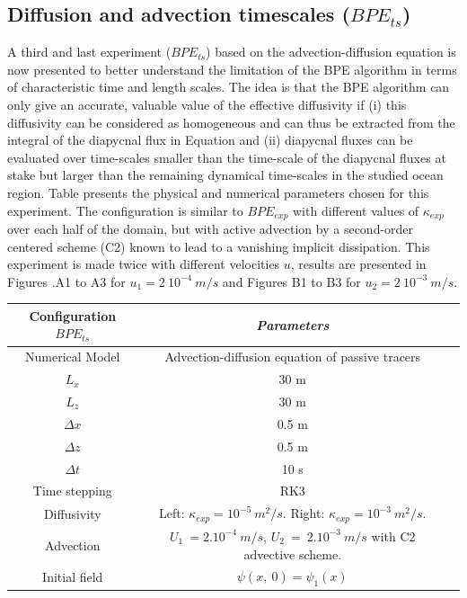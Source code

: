 \subsection{Diffusion and advection timescales ($BPE_{ts}$)}
A third and last experiment ($BPE_{ts}$) based on the advection-diffusion equation  is now presented to better understand the limitation of the BPE algorithm in terms of characteristic time and length scales. The idea is that the BPE algorithm can only give an accurate, valuable value of the effective diffusivity if (i) this diffusivity can be considered as homogeneous and can thus be extracted from the integral of the diapycnal flux in Equation  and (ii) diapycnal fluxes can be evaluated over time-scales smaller than the time-scale of the diapycnal fluxes at stake but larger than the remaining dynamical time-scales in the studied ocean region.
Table  presents the physical and numerical parameters chosen for this experiment. The configuration is similar to $BPE_{exp}$ with different values of $\kappa_{exp}$ over each half of the domain, but with active advection by a second-order centered scheme (C2) known to lead to a vanishing implicit dissipation. This experiment is made twice with different velocities $u$, results are presented in Figures .A1 to A3 for $u_1=2\ 10^{-4}\ m/s$ and Figures B1 to B3 for $u_2=2\ 10^{-3}\ m/s$.
\begin{table}[h]
        \centering
        \begin{tabular}{|c|c|c|}
                \hline
                Configuration $BPE_{ts}$ & \textit{Parameters}\\
                \hline 
                Numerical Model & Advection-diffusion equation of passive tracers\\
                $L_x$ & 30 m\\
                $L_z$ & 30 m\\
                $\Delta x$ & 0.5 m\\
                $\Delta z$ & 0.5 m\\
                $\Delta t$ & 10 s\\
                Time stepping & RK3 \\
                Diffusivity & Left: $\kappa_{exp} = 10^{-5} \ m^2/s$. Right: $\kappa_{exp} = 10^{-3} \ m^2/s$.\\
                Advection & $U_1\ = 2.10^{-4}\ m/s$, $U_2\ =\ 2.10^{-3}\ m/s$ with C2 advective scheme.\\
                Initial field & $\psi(x,\ 0)=\psi_1(x)$\\
                \hline
        \end{tabular}
        \label{tab_NUMLAB_ts}
\end{table}

